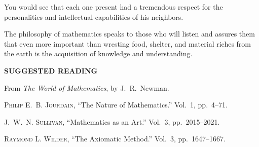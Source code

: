 \documentclass[11pt]{book}
\begin{document}
You would see that each one present had a tremendous respect for the
personalities and intellectual capabilities of his neighbors.

The philosophy of mathematics speaks to those who will listen and assures them
that even more important than wresting food, shelter, and material riches from
the earth is the acquisition of knowledge and understanding.

\par\medskip
\begin{center}\bfseries SUGGESTED READING\end{center}
\par\nopagebreak\medskip

\noindent From \emph{The World of Mathematics}, by J.~R.~Newman.
\begingroup\raggedright
\begin{exlist}
\item \textsc{Philip} E.~B. \textsc{Jourdain}, ``The Nature of Mathematics.''
      Vol.~1, pp.~4--71.
\item J.~W.~N. \textsc{Sullivan}, ``Mathematics as an Art.''
      Vol.~3, pp.~2015--2021.
\item \textsc{Raymond} L. \textsc{Wilder}, ``The Axiomatic Method.''
      Vol.~3, pp.~1647--1667.
\end{exlist}
\endgroup
\end{document}
